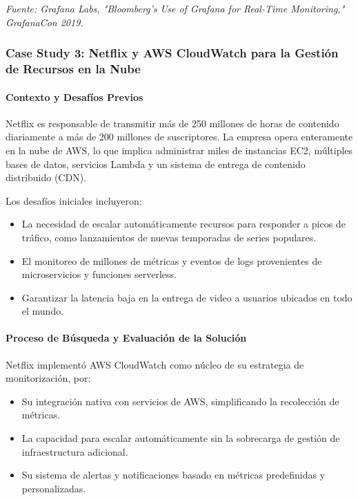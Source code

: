 {                \begin{flushright}
                \textit{Fuente: Grafana Labs, "Bloomberg's Use of Grafana for Real-Time Monitoring," GrafanaCon 2019.}
                \end{flushright}
            
            \subsubsection{Case Study 3: Netflix y AWS CloudWatch para la Gestión de Recursos en la Nube}
                \paragraph{Contexto y Desafíos Previos}  
                Netflix es responsable de transmitir más de 250 millones de horas de contenido diariamente a más de 200 millones de suscriptores. La empresa opera enteramente en la nube de AWS, lo que implica administrar miles de instancias EC2, múltiples bases de datos, servicios Lambda y un sistema de entrega de contenido distribuido (CDN).
                
                Los desafíos iniciales incluyeron:
                \begin{itemize}
                    \item La necesidad de escalar automáticamente recursos para responder a picos de tráfico, como lanzamientos de nuevas temporadas de series populares.
                    \item El monitoreo de millones de métricas y eventos de logs provenientes de microservicios y funciones serverless.
                    \item Garantizar la latencia baja en la entrega de video a usuarios ubicados en todo el mundo.
                \end{itemize}
                
                \paragraph{Proceso de Búsqueda y Evaluación de la Solución}  
                Netflix implementó AWS CloudWatch como núcleo de su estrategia de monitorización, por:
                \begin{itemize}
                    \item Su integración nativa con servicios de AWS, simplificando la recolección de métricas.
                    \item La capacidad para escalar automáticamente sin la sobrecarga de gestión de infraestructura adicional.
                    \item Su sistema de alertas y notificaciones basado en métricas predefinidas y personalizadas.
                \end{itemize}
                
}
